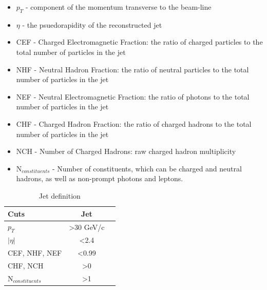 \begin{itemize}
  \item $p_{T}$ - component of the momentum transverse to the
    beam-line
  \item $\eta$ - the psuedorapidity of the reconstructed jet
  \item CEF - Charged Electromagnetic Fraction: the ratio of
    charged particles to the total number of particles in the jet
  \item NHF - Neutral Hadron Fraction: the ratio of neutral
    particles to the total number of particles in the jet
  \item NEF -  Neutral Electromagnetic Fraction: the ratio of
    photons to the total number of particles in the jet
  \item CHF - Charged Hadron Fraction: the ratio of charged hadrons to
    the total number of particles in the jet
  \item NCH - Number of Charged Hadrons: raw charged hadron multiplicity
  \item N$_{constituents}$ - Number of constituents, which can be charged
  and neutral hadrons, as well as non-prompt photons and leptons.  
\end{itemize}

\begin{table}[hbtp]\footnotesize
\centering
\begin{tabular}{|l|c|c|}
\hline\hline
Cuts & Jet  \\
\hline
$p_{T}$ & \textgreater 30 GeV/c  \\
\hline
$|\eta|$ & \textless 2.4 \\
\hline
CEF, NHF, NEF & \textless 0.99 \\
\hline
CHF, NCH & \textgreater 0 \\
\hline
N$_{constituents}$ & \textgreater 1 \\
\hline\hline
\end{tabular}
\caption{Jet definition}
\label{tab:JetTable}
\end{table} 

